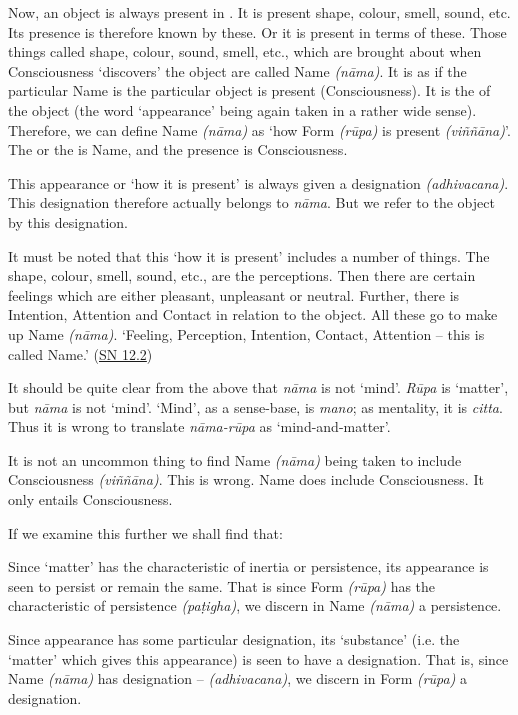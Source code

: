 Now, an object is always present in . It is present  shape, colour, smell, sound, etc. Its presence is therefore known by these. Or it is present in terms of these. Those things called shape, colour, sound, smell, etc., which are brought about when Consciousness `discovers' the object are called Name \emph{(nāma)}. It is as if the particular Name is  the particular object is present (Consciousness). It is the  of the object (the word `appearance' being again taken in a rather wide sense). Therefore, we can define Name \emph{(nāma)} as `how Form \emph{(rūpa)} is present \emph{(viññāna)}'. The  or the  is Name, and the presence is Consciousness.

This appearance or `how it is present' is always given a designation \emph{(adhivacana)}. This designation therefore actually belongs to \emph{nāma}. But we refer to the object by this designation.

It must be noted that this `how it is present' includes a number of things. The shape, colour, smell, sound, etc., are the perceptions. Then there are certain feelings which are either pleasant, unpleasant or neutral. Further, there is Intention, Attention and Contact in relation to the object. All these go to make up Name \emph{(nāma)}. `Feeling, Perception, Intention, Contact, Attention -- this is called Name.' (\href{https://suttacentral.net/sn12.2/en/bodhi}{SN 12.2})

It should be quite clear from the above that \emph{nāma} is not `mind'. \emph{Rūpa} is `matter', but \emph{nāma} is not `mind'. `Mind', as a sense-base, is \emph{mano}; as mentality, it is \emph{citta}. Thus it is wrong to translate \emph{nāma-rūpa} as `mind-and-matter'.

It is not an uncommon thing to find Name \emph{(nāma)} being taken to include Consciousness \emph{(viññāna)}. This is wrong. Name does  include Consciousness. It only entails Consciousness.

If we examine this further we shall find that:

 Since `matter' has the characteristic of inertia or persistence, its appearance is seen to persist or remain the same. That is since Form \emph{(rūpa)} has the characteristic of persistence \emph{(paṭigha)}, we discern in Name \emph{(nāma)} a persistence.

 Since appearance has some particular designation, its `substance' (i.e. the `matter' which gives this appearance) is seen to have a designation. That is, since Name \emph{(nāma)} has designation -- \emph{(adhivacana)}, we discern in Form \emph{(rūpa)} a designation.

